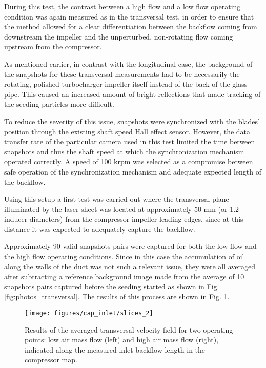 During this test, the contrast between a high flow and a low flow operating condition was again measured as in the transversal test, in order to ensure that the method allowed for a clear differentiation between the backflow coming from downstream the impeller and the unperturbed, non-rotating flow coming upstream from the compressor.

As mentioned earlier, in contrast with the longitudinal case, the background of the snapshots for these transversal measurements had to be necessarily the rotating, polished turbocharger impeller itself instead of the back of the glass pipe. This caused an increased amount of bright reflections that made tracking of the seeding particles more difficult. 

To reduce the severity of this issue, snapshots were synchronized with the blades' position through the existing shaft speed Hall effect sensor. However, the data transfer rate of the particular camera used in this test limited the time between snapshots and thus the shaft speed at which the synchronization mechanism operated correctly. A speed of 100 krpm was selected as a compromise between safe operation of the synchronization mechanism and adequate expected length of the backflow.

Using this setup a first test was carried out where the transversal plane illuminated by the laser sheet was located at approximately 50 mm (or 1.2 inducer diameters) from the compressor impeller leading edges, since at this distance it was expected to adequately capture the backflow. 

Approximately 90 valid snapshots pairs were captured for both the low flow and the high flow operating conditions. Since in this case the accumulation of oil along the walls of the duct was not such a relevant issue, they were all averaged after subtracting a reference background image made from the average of 10 snapshots pairs captured before the seeding started as shown in Fig. \ref{fig:photos_transversal}. The results of this process are shown in Fig. \ref{fig:slices_2}.

\begin{figure}[thb!]
\hspace{-0.1\textwidth}
\texttt{[image: figures/cap\_inlet/slices\_2]}
\caption{Results of the averaged transversal velocity field for two operating points: low air mass flow (left) and high air mass flow (right), indicated along the measured inlet backflow length in the compressor map.}
\label{fig:slices_2}
\end{figure}

